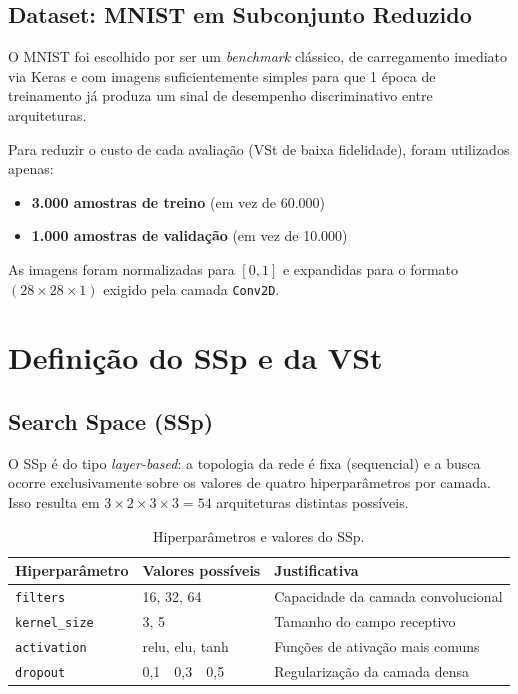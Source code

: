\documentclass[a4paper,12pt]{article}
\begin{document}
\subsection{Dataset: MNIST em Subconjunto Reduzido}

O MNIST foi escolhido por ser um \textit{benchmark} clássico, de carregamento imediato via Keras e com imagens suficientemente simples para que 1 época de treinamento já produza um sinal de desempenho discriminativo entre arquiteturas.

Para reduzir o custo de cada avaliação (VSt de baixa fidelidade), foram utilizados apenas:
\begin{itemize}[noitemsep]
    \item \textbf{3.000 amostras de treino} (em vez de 60.000)
    \item \textbf{1.000 amostras de validação} (em vez de 10.000)
\end{itemize}

As imagens foram normalizadas para $[0, 1]$ e expandidas para o formato $(28 \times 28 \times 1)$ exigido pela camada \texttt{Conv2D}.

\section{Definição do SSp e da VSt}

\subsection{Search Space (SSp)}

O SSp é do tipo \textit{layer-based}: a topologia da rede é fixa (sequencial) e a busca ocorre exclusivamente sobre os valores de quatro hiperparâmetros por camada. Isso resulta em $3 \times 2 \times 3 \times 3 = 54$ arquiteturas distintas possíveis.

\begin{table}[h]
\centering
\caption{Hiperparâmetros e valores do SSp.}
\begin{tabular}{lll}
\toprule
\textbf{Hiperparâmetro} & \textbf{Valores possíveis} & \textbf{Justificativa} \\
\midrule
\texttt{filters}      & 16, 32, 64            & Capacidade da camada convolucional \\
\texttt{kernel\_size} & 3, 5                  & Tamanho do campo receptivo \\
\texttt{activation}   & relu, elu, tanh       & Funções de ativação mais comuns \\
\texttt{dropout}      & 0,1\ \ 0,3\ \ 0,5    & Regularização da camada densa \\
\bottomrule
\end{tabular}
\end{table}
\end{document}
